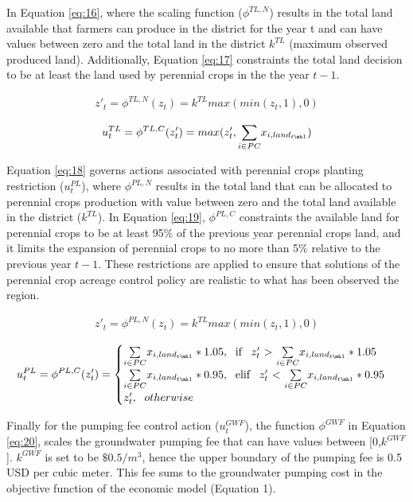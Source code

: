 \documentclass[a4paper,fleqn]{cas-sc}
\begin{document}
In Equation \ref{eq:16}, where the scaling function ($\phi^{TL,N}$) results in the total land available that farmers can produce in the district for the year t and can have values between zero and the total land in the district $k^{TL}$ (maximum observed produced land). Additionally, Equation \ref{eq:17} constraints the total land decision to be at least the land used by perennial crops in the the year $t-1$.

\begin{align}\label{eq:16}
z'_{t} = \phi^{TL,N}(z_{t}) = k^{TL}max(min(z_{t},1),0)
\end{align}

\begin{align}\label{eq:17}
u^{TL}_t = \phi^{TL,C}(z'_{t})= max(z'_{t},\underset{i \in PC}{\sum} x_{i,land_{t\mh1}})
\end{align}

Equation \ref{eq:18} governs actions associated with perennial crops planting restriction ($u^{PL}_t$), where $\phi^{PL,N}$ results in the total land that can be allocated to perennial crops production with value between zero and the total land available in the district ($k^{TL}$). In Equation \ref{eq:19}, $\phi^{PL,C}$ constraints the available land for perennial crops to be at least 95\% of the previous year perennial crops land, and it limits the expansion of perennial crops to no more than 5\% relative to the previous year $t-1$. These restrictions are applied to ensure that solutions of the perennial crop acreage control policy are realistic to what has been observed the region.

\begin{align}\label{eq:18}
z'_{t} = \phi^{PL,N}(z_{t}) = k^{TL}max(min(z_{t},1),0)
\end{align}

\begin{align}\label{eq:19}
u^{PL}_t = \phi^{PL,C}(z'_{t})= \begin{cases}
      \underset{i\in{PC}}{\sum} x_{i,land_{t\mh1}}*1.05,  \text{\; if \, $z'_{t}$  $>$ $\underset{i\in PC}{\sum}x_{i,land_{t\mh1}}*1.05$}\\
       \underset{i\in PC}{\sum} x_{i,land_{t\mh1}}*0.95, \text{\; elif \, $z'_{t}$  $<$ $\underset{i\in PC}{\sum}x_{i,land_{t\mh1}}*0.95$}\\
      z'_{t}, \text{\; $otherwise$}
\end{cases}     
\end{align}

Finally for the pumping fee control action ($u^{GWF}_t$), the function $\phi^{GWF}$ in Equation \ref{eq:20}, scales the groundwater pumping fee that can have values between [0,$k^{GWF}$]. $k^{GWF}$ is set to be $\$0.5/m^3$, hence the upper boundary of the pumping fee is 0.5 USD per cubic meter. This fee sums to the groundwater pumping cost in the objective function of the economic model (Equation 1).
\end{document}
